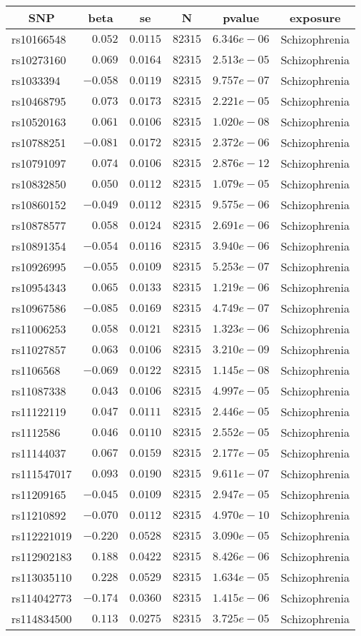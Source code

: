 \begin{tabular}{lrrrrl}
\hline\hline
\multicolumn{1}{c}{SNP}&\multicolumn{1}{c}{beta}&\multicolumn{1}{c}{se}&\multicolumn{1}{c}{N}&\multicolumn{1}{c}{pvalue}&\multicolumn{1}{c}{exposure}\tabularnewline
\hline
rs10166548&$ 0.052$&$0.0115$&$ 82315$&$6.346e-06$&Schizophrenia\tabularnewline
rs10273160&$ 0.069$&$0.0164$&$ 82315$&$2.513e-05$&Schizophrenia\tabularnewline
rs1033394&$-0.058$&$0.0119$&$ 82315$&$9.757e-07$&Schizophrenia\tabularnewline
rs10468795&$ 0.073$&$0.0173$&$ 82315$&$2.221e-05$&Schizophrenia\tabularnewline
rs10520163&$ 0.061$&$0.0106$&$ 82315$&$1.020e-08$&Schizophrenia\tabularnewline
rs10788251&$-0.081$&$0.0172$&$ 82315$&$2.372e-06$&Schizophrenia\tabularnewline
rs10791097&$ 0.074$&$0.0106$&$ 82315$&$2.876e-12$&Schizophrenia\tabularnewline
rs10832850&$ 0.050$&$0.0112$&$ 82315$&$1.079e-05$&Schizophrenia\tabularnewline
rs10860152&$-0.049$&$0.0112$&$ 82315$&$9.575e-06$&Schizophrenia\tabularnewline
rs10878577&$ 0.058$&$0.0124$&$ 82315$&$2.691e-06$&Schizophrenia\tabularnewline
rs10891354&$-0.054$&$0.0116$&$ 82315$&$3.940e-06$&Schizophrenia\tabularnewline
rs10926995&$-0.055$&$0.0109$&$ 82315$&$5.253e-07$&Schizophrenia\tabularnewline
rs10954343&$ 0.065$&$0.0133$&$ 82315$&$1.219e-06$&Schizophrenia\tabularnewline
rs10967586&$-0.085$&$0.0169$&$ 82315$&$4.749e-07$&Schizophrenia\tabularnewline
rs11006253&$ 0.058$&$0.0121$&$ 82315$&$1.323e-06$&Schizophrenia\tabularnewline
rs11027857&$ 0.063$&$0.0106$&$ 82315$&$3.210e-09$&Schizophrenia\tabularnewline
rs1106568&$-0.069$&$0.0122$&$ 82315$&$1.145e-08$&Schizophrenia\tabularnewline
rs11087338&$ 0.043$&$0.0106$&$ 82315$&$4.997e-05$&Schizophrenia\tabularnewline
rs11122119&$ 0.047$&$0.0111$&$ 82315$&$2.446e-05$&Schizophrenia\tabularnewline
rs1112586&$ 0.046$&$0.0110$&$ 82315$&$2.552e-05$&Schizophrenia\tabularnewline
rs11144037&$ 0.067$&$0.0159$&$ 82315$&$2.177e-05$&Schizophrenia\tabularnewline
rs111547017&$ 0.093$&$0.0190$&$ 82315$&$9.611e-07$&Schizophrenia\tabularnewline
rs11209165&$-0.045$&$0.0109$&$ 82315$&$2.947e-05$&Schizophrenia\tabularnewline
rs11210892&$-0.070$&$0.0112$&$ 82315$&$4.970e-10$&Schizophrenia\tabularnewline
rs112221019&$-0.220$&$0.0528$&$ 82315$&$3.090e-05$&Schizophrenia\tabularnewline
rs112902183&$ 0.188$&$0.0422$&$ 82315$&$8.426e-06$&Schizophrenia\tabularnewline
rs113035110&$ 0.228$&$0.0529$&$ 82315$&$1.634e-05$&Schizophrenia\tabularnewline
rs114042773&$-0.174$&$0.0360$&$ 82315$&$1.415e-06$&Schizophrenia\tabularnewline
rs114834500&$ 0.113$&$0.0275$&$ 82315$&$3.725e-05$&Schizophrenia\tabularnewline

\end{tabular}
